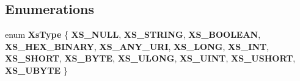 \subsection*{Enumerations}
\begin{DoxyCompactItemize}
\item 
\mbox{\label{group__schema_ga1b5bfe9c3418e3d48c52a1c8910cf7cb}} 
enum {\bfseries Xs\+Type} \{ \newline
{\bfseries X\+S\+\_\+\+N\+U\+LL}, 
\newline
{\bfseries X\+S\+\_\+\+S\+T\+R\+I\+NG}, 
\newline
{\bfseries X\+S\+\_\+\+B\+O\+O\+L\+E\+AN}, 
\newline
{\bfseries X\+S\+\_\+\+H\+E\+X\+\_\+\+B\+I\+N\+A\+RY}, 
\newline
{\bfseries X\+S\+\_\+\+A\+N\+Y\+\_\+\+U\+RI}, 
\newline
{\bfseries X\+S\+\_\+\+L\+O\+NG}, 
\newline
{\bfseries X\+S\+\_\+\+I\+NT}, 
\newline
{\bfseries X\+S\+\_\+\+S\+H\+O\+RT}, 
\newline
{\bfseries X\+S\+\_\+\+B\+Y\+TE}, 
\newline
{\bfseries X\+S\+\_\+\+U\+L\+O\+NG}, 
\newline
{\bfseries X\+S\+\_\+\+U\+I\+NT}, 
\newline
{\bfseries X\+S\+\_\+\+U\+S\+H\+O\+RT}, 
\newline
{\bfseries X\+S\+\_\+\+U\+B\+Y\+TE}
 \}
\end{DoxyCompactItemize}
